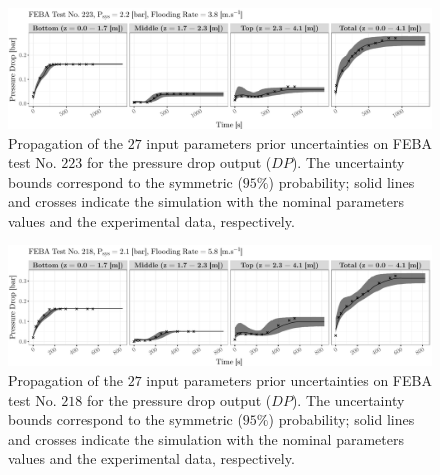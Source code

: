 \begin{figure}[!h]
    \centering
    \includegraphics[width=1.0\textwidth]{../figures/chapter2/figures/plotTraceUQPriorDP223}
    \caption[Propagation of the $27$ input parameters prior uncertainties on FEBA test No. $223$ for the pressure drop output ($DP$).]{Propagation of the $27$ input parameters prior uncertainties on FEBA test No. $223$ for the pressure drop output ($DP$). The uncertainty bounds correspond to the symmetric ($95\%$) probability; solid lines and crosses indicate the simulation with the nominal parameters values and the experimental data, respectively.}
    \label{fig:ch2_plot_trace_uq_prior_dp_223}
\end{figure}

\clearpage

\begin{figure}[bth]
    \centering
    \includegraphics[width=1.0\textwidth]{../figures/chapter2/figures/plotTraceUQPriorDP218}
    \caption[Propagation of the $27$ input parameters prior uncertainties on FEBA test No. $218$ for the pressure drop output ($DP$).]{Propagation of the $27$ input parameters prior uncertainties on FEBA test No. $218$ for the pressure drop output ($DP$). The uncertainty bounds correspond to the symmetric ($95\%$) probability; solid lines and crosses indicate the simulation with the nominal parameters values and the experimental data, respectively.}
    \label{fig:ch2_plot_trace_uq_prior_dp_218}
\end{figure}


